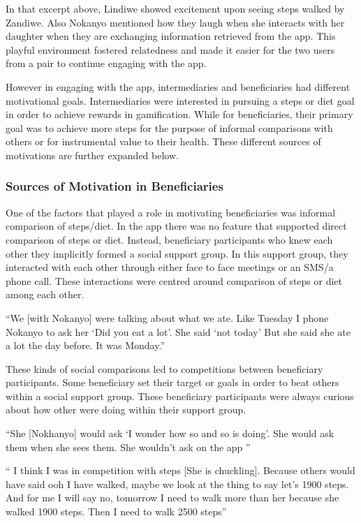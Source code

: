 In that excerpt above, Lindiwe showed excitement upon seeing steps walked by Zandiwe. Also Nokanyo mentioned how they laugh when she interacts with her daughter when they are exchanging information retrieved from the app. This playful environment fostered relatedness and made it easier for the two users from a pair to continue engaging with the app. 

However in engaging with the app, intermediaries and beneficiaries had different motivational goals. Intermediaries were interested in pursuing a steps or diet goal in order to achieve rewards in gamification. While for beneficiaries, their primary goal was to achieve more steps for the purpose of informal comparisons with others or for instrumental value to their health. These different sources of motivations are further expanded below.
\subsubsection{Sources of Motivation in Beneficiaries}
One of the factors that played a role in motivating beneficiaries was informal comparison of steps/diet. In the app there was no feature that supported direct comparison of steps or diet. Instead, beneficiary participants who knew each other they implicitly formed a social support group. In this support group, they interacted with each other through either face to face meetings or an SMS/a phone call. These interactions were centred around comparison of steps or diet among each other. 
 
 {``We [with Nokanyo] were talking about what we ate. Like Tuesday I phone Nokanyo to ask her `Did you eat a lot'. She said `not today' But she said she ate a lot the day before. It was Monday.''}

These kinds of social comparisons led to competitions between beneficiary participants. Some beneficiary set their target or goals in order to beat others within a social support group. These beneficiary participants were always curious about how other were doing within their support group.
 
 {``She [Nokhanyo] would ask `I wonder how so and so is doing'. She would ask them when she sees them. She wouldn't ask on the app ''}

{`` I think I was in competition with steps [She is chuckling]. Because others would have said ooh I have walked, maybe we look at the thing to say let’s 1900 steps. And for me I will say no, tomorrow I need to walk more than her because she walked 1900 steps. Then I need to walk 2500 steps''} 


